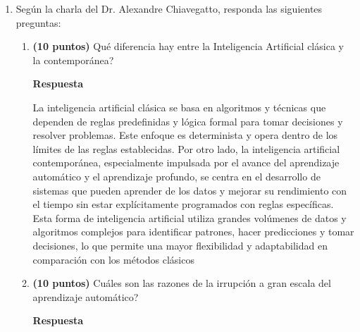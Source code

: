 \documentclass{article}
\begin{document}
\begin{enumerate}
\item Según la charla del Dr. Alexandre Chiavegatto, responda las siguientes
preguntas:
\begin{enumerate}
\item \textbf{(10 puntos)} Qué diferencia hay entre la Inteligencia Artificial
clásica y la contemporánea?

\textbf{Respuesta}
\vspace{5px}
\par La inteligencia artificial clásica se basa en algoritmos y técnicas que dependen de reglas predefinidas y lógica formal para tomar decisiones y resolver problemas. Este enfoque es determinista y opera dentro de los límites de las reglas establecidas.
Por otro lado, la inteligencia artificial contemporánea, especialmente impulsada por el avance del aprendizaje automático y el aprendizaje profundo, se centra en el desarrollo de sistemas que pueden aprender de los datos y mejorar su rendimiento con el tiempo sin estar explícitamente programados con reglas específicas. Esta forma de inteligencia artificial utiliza grandes volúmenes de datos y algoritmos complejos para identificar patrones, hacer predicciones y tomar decisiones, lo que permite una mayor flexibilidad y adaptabilidad en comparación con los métodos clásicos

\item \textbf{(10 puntos)} Cuáles son las razones de la irrupción a gran
escala del aprendizaje automático?
\vspace{5px}
\par\textbf{Respuesta}
\vspace{5px}


\end{enumerate}
\end{enumerate}
\end{document}

